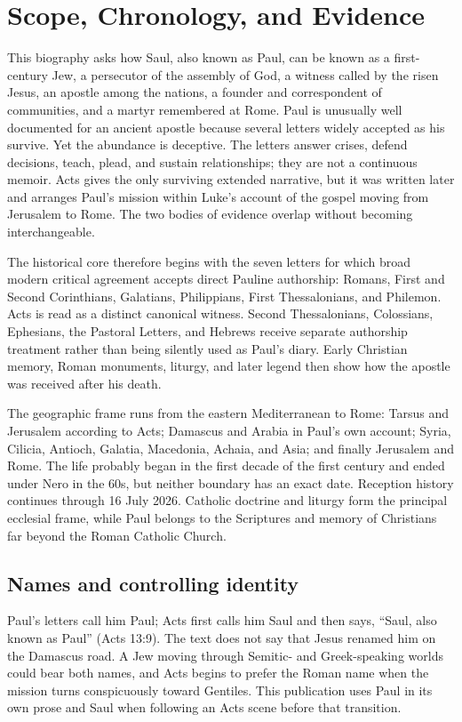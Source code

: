 \section{Scope, Chronology, and Evidence}\label{sec:paul-method}

This biography asks how Saul, also known as Paul, can be known as a
first-century Jew, a
persecutor of the assembly of God, a witness called by the risen Jesus, an
apostle among the nations, a founder and correspondent of communities, and a
martyr remembered at Rome. Paul is unusually well documented for an ancient
apostle because several letters widely accepted as his survive. Yet the
abundance is deceptive. The letters answer crises, defend decisions, teach,
plead, and sustain relationships; they are not a continuous memoir. Acts gives
the only surviving extended narrative, but it was written later and arranges
Paul's mission within Luke's account of the gospel moving from Jerusalem to
Rome. The two bodies of evidence overlap without becoming interchangeable.

The historical core therefore begins with the seven letters for which broad
modern critical agreement accepts direct Pauline authorship: Romans, First and
Second Corinthians, Galatians, Philippians, First Thessalonians, and Philemon.
Acts is read as a distinct canonical witness. Second Thessalonians,
Colossians, Ephesians, the Pastoral Letters, and Hebrews receive separate
authorship treatment rather than being silently used as Paul's diary. Early
Christian memory, Roman monuments, liturgy, and later legend then show how the
apostle was received after his death.

The geographic frame runs from the eastern Mediterranean to Rome: Tarsus and
Jerusalem according to Acts; Damascus and Arabia in Paul's own account;
Syria, Cilicia, Antioch, Galatia, Macedonia, Achaia, and Asia; and finally
Jerusalem and Rome. The life probably began in the first decade of the first
century and ended under Nero in the 60s, but neither boundary has an exact
date. Reception history continues through 16 July 2026. Catholic doctrine and
liturgy form the principal ecclesial frame, while Paul belongs to the
Scriptures and memory of Christians far beyond the Roman Catholic Church.

\subsection{Names and controlling identity}

Paul's letters call him Paul; Acts first calls him Saul and then says, ``Saul,
also known as Paul'' (Acts 13:9). The text does not say that Jesus renamed him
on the Damascus road. A Jew moving through Semitic- and Greek-speaking worlds
could bear both names, and Acts begins to prefer the Roman name when the
mission turns conspicuously toward Gentiles. This publication uses Paul in its
own prose and Saul when following an Acts scene before that transition.

